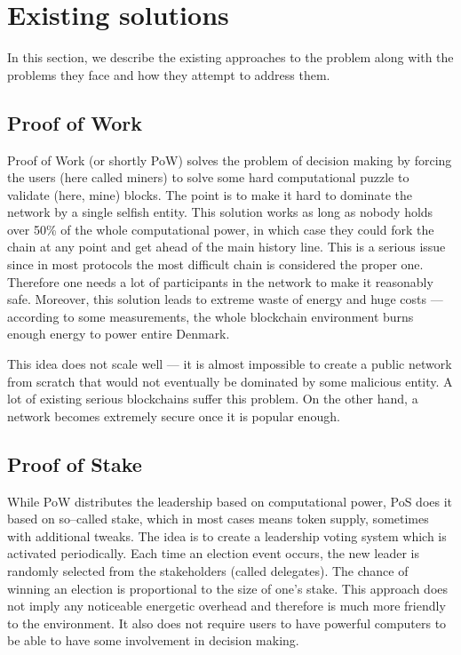 \section{Existing solutions}

In this section, we describe the existing approaches to the problem along with
the problems they face and how they attempt to address them.

\subsection{Proof of Work}

Proof of Work (or shortly PoW) solves the problem of decision making by forcing
the users (here called miners) to solve some hard computational puzzle to
validate (here, mine) blocks\cite{bitcoin}. The point is to make it hard to
dominate the network by a single selfish entity. This solution works as long as
nobody holds over 50\% of the whole computational power, in which case they
could fork the chain at any point and get ahead of the main history line. This
is a serious issue since in most protocols the most difficult chain is
considered the proper one. Therefore one needs a lot of participants in the
network to make it reasonably safe. Moreover, this solution leads to extreme
waste of energy and huge costs --- according to some measurements, the whole
blockchain environment burns enough energy to power entire
Denmark\cite{bitcoin_energy}.

This idea does not scale well --- it is almost impossible to create a public
network from scratch that would not eventually be dominated by some malicious
entity. A lot of existing serious blockchains suffer this
problem\cite{51attack}. On the other hand, a network becomes extremely secure
once it is popular enough.

\subsection{Proof of Stake}

While PoW distributes the leadership based on computational power, PoS does it
based on so–called stake, which in most cases means token supply, sometimes with
additional tweaks\cite{peercoin}\cite{cryptocurr_without_pow}. The idea is to
create a leadership voting system which is activated periodically. Each time an
election event occurs, the new leader is randomly selected from the stakeholders
(called delegates). The chance of winning an election is proportional to the
size of one's stake. This approach does not imply any noticeable energetic
overhead and therefore is much more friendly to the environment. It also does
not require users to have powerful computers to be able to have some involvement
in decision making.

